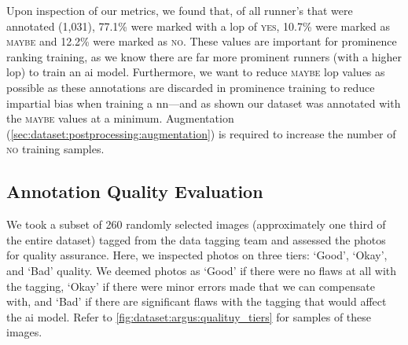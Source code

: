 Upon inspection of our  metrics, we found that, of all runner's that were annotated (1,031), 77.1\% were marked with a \gls{lop} of \textsc{yes}, 10.7\% were marked as \textsc{maybe} and 12.2\% were marked as \textsc{no}. These values are important for prominence ranking training, as we know there are far more prominent runners (with a higher \gls{lop}) to train an \gls{ai} model. Furthermore, we want to reduce \textsc{maybe} \gls{lop} values as possible as these annotations are discarded in prominence training to reduce impartial bias when training a \gls{nn}---and as shown our dataset was annotated with the \textsc{maybe} values at a minimum. Augmentation (\cref{sec:dataset:postprocessing:augmentation}) is required to increase the number of \textsc{no} training samples.

\subsection{Annotation Quality Evaluation}
\label{sec:dataset:argus:quality_eval}

We took a subset of 260 randomly selected images  (approximately one third of the entire dataset) tagged from the data tagging team and assessed the photos for quality assurance. Here, we inspected photos on three tiers: `Good', `Okay', and `Bad' quality. We deemed photos as `Good' if there were no flaws at all with the tagging, `Okay' if there were minor errors made that we can compensate with, and `Bad' if there are significant flaws with the tagging that would affect the \gls{ai} model. Refer to \cref{fig:dataset:argus:qualituy_tiers} for samples of these images.

